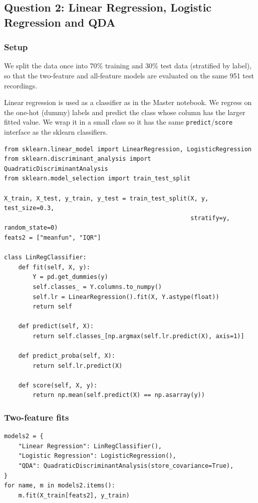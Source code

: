 \documentclass[11pt]{article}
\begin{document}
\clearpage
\subsection*{Question 2: Linear Regression, Logistic Regression and QDA}

\subsubsection*{Setup}

We split the data once into 70\% training and 30\% test data (stratified by label), so that
the two-feature and all-feature models are evaluated on the same 951 test recordings.

Linear regression is used as a classifier as in the Master notebook. We regress on the
one-hot (dummy) labels and predict the class whose column has the larger fitted value. We
wrap it in a small class so it has the same \texttt{predict}/\texttt{score} interface as
the sklearn classifiers.

\begin{lstlisting}
from sklearn.linear_model import LinearRegression, LogisticRegression
from sklearn.discriminant_analysis import QuadraticDiscriminantAnalysis
from sklearn.model_selection import train_test_split

X_train, X_test, y_train, y_test = train_test_split(X, y, test_size=0.3,
                                                    stratify=y, random_state=0)
feats2 = ["meanfun", "IQR"]

class LinRegClassifier:
    def fit(self, X, y):
        Y = pd.get_dummies(y)
        self.classes_ = Y.columns.to_numpy()
        self.lr = LinearRegression().fit(X, Y.astype(float))
        return self

    def predict(self, X):
        return self.classes_[np.argmax(self.lr.predict(X), axis=1)]

    def predict_proba(self, X):
        return self.lr.predict(X)

    def score(self, X, y):
        return np.mean(self.predict(X) == np.asarray(y))
\end{lstlisting}

\subsubsection*{Two-feature fits}

\begin{lstlisting}
models2 = {
    "Linear Regression": LinRegClassifier(),
    "Logistic Regression": LogisticRegression(),
    "QDA": QuadraticDiscriminantAnalysis(store_covariance=True),
}
for name, m in models2.items():
    m.fit(X_train[feats2], y_train)
\end{lstlisting}
\end{document}
